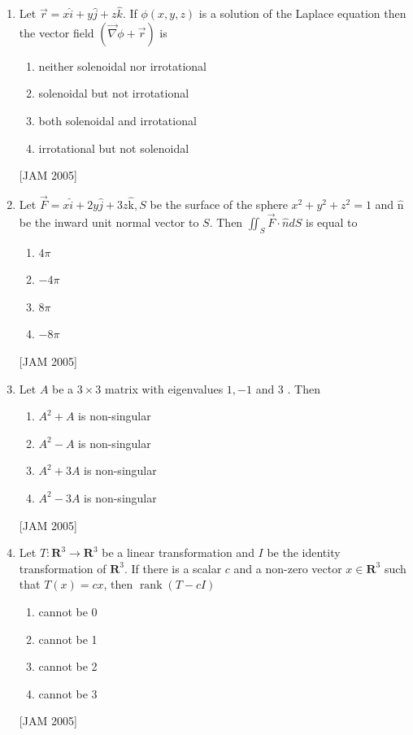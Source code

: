 \begin{enumerate}
\item  Let $\vec{r}=x \hat{i}+y \hat{j}+z \hat{k}$. If $\phi(x, y, z)$ is a solution of the Laplace equation then the vector field $(\vec{\nabla} \phi+\vec{r})$ is
\begin{enumerate}
    \item  neither solenoidal nor irrotational
    \item solenoidal but not irrotational
    \item both solenoidal and irrotational
    \item irrotational but not solenoidal
 \end{enumerate}
 \hfill [JAM 2005]



 
\item  Let $\vec{F}=x \hat{i}+2 y \hat{j}+3 z \hat{\mathrm{k}}, S$ be the surface of the sphere $x^{2}+y^{2}+z^{2}=1$ and $\hat{\mathrm{n}}$ be the inward unit normal vector to $S$. Then $\iint_{S} \vec{F} \cdot \hat{n} d S$ is equal to
\begin{enumerate} 
    \item $4 \pi$
    \item $-4 \pi$
    \item $8 \pi$
    \item $-8 \pi$ 
\end{enumerate}
 \hfill [JAM 2005]



 
\item Let $A$ be a $3 \times 3$ matrix with eigenvalues $1,-1$ and 3 . Then
\begin{enumerate}
    \item $A^{2}+A$ is non-singular
    \item $A^{2}-A$ is non-singular
    \item $A^{2}+3 A$ is non-singular
    \item $A^{2}-3 A$ is non-singular
 \end{enumerate}
 \hfill [JAM 2005]

 
\item Let $T: \boldsymbol{R}^{3} \longrightarrow \boldsymbol{R}^{3}$ be a linear transformation and $I$ be the identity transformation of $\boldsymbol{R}^{3}$. If there is a scalar $c$ and a non-zero vector $x \in \boldsymbol{R}^{3}$ such that $T(x)=c x$, then $\operatorname{rank}(T-c I)$
\begin{enumerate} 
    \item cannot be 0
    \item cannot be 1
    \item cannot be 2
    \item cannot be 3
\end{enumerate}
 \hfill [JAM 2005]




\end{enumerate}
